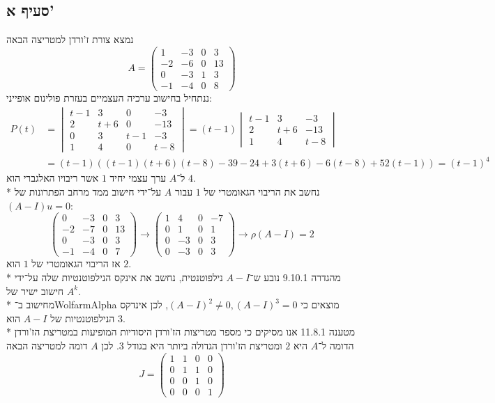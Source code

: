 \subsection{סעיף א'}
נמצא צורת ז'ורדן למטריצה הבאה
\[
	A = \begin{pmatrix}
		1 & -3 & 0 & 3 \\
		-2 & -6 & 0 & 13 \\
		0 & -3 & 1 & 3 \\
		-1 & -4 & 0 & 8
	\end{pmatrix}
\]
ננתחיל בחישוב ערכיה העצמיים בעזרת פולינום אופייני:
\begin{align*}
	P(t)
	& = \begin{vmatrix}
		t - 1 & 3 & 0 & -3 \\
		2 & t + 6 & 0 & -13 \\
		0 & 3 & t - 1 & -3 \\
		1 & 4 & 0 & t - 8
	\end{vmatrix}
	= (t - 1) \begin{vmatrix}
		t - 1 & 3 & -3 \\
		2 & t + 6 & -13 \\
		1 & 4 & t - 8
	\end{vmatrix} \\
	& = (t - 1) ((t -1) (t + 6) (t - 8) - 39 - 24 + 3 (t + 6) - 6 (t - 8) + 52 (t - 1)) = {(t - 1)}^4
\end{align*}
ל־$A$ ערך עצמי יחיד $1$ אשר ריבויו האלגברי הוא $4$. \\*
נחשב את הריבוי הגאומטרי של $1$ עבור $A$ על־ידי חישוב ממד מרחב הפתרונות של $(A - I) u = 0$:
\[
	\begin{pmatrix}
		0 & -3 & 0 & 3 \\
		-2 & -7 & 0 & 13 \\
		0 & -3 & 0 & 3 \\
		-1 & -4 & 0 & 7
	\end{pmatrix}
	\rightarrow
	\begin{pmatrix}
		1 & 4 & 0 & -7 \\
		0 & 1 & 0 & 1 \\
		0 & -3 & 0 & 3 \\
		0 & -3 & 0 & 3
	\end{pmatrix}
	\rightarrow \rho (A - I) = 2
\]
אז הריבוי הגאומטרי של $1$ הוא $2$. \\*
מהגדרה 9.10.1 נובע ש־$A - I$ נילפוטנטית, נחשב את אינקס הנילפוטנטיות שלה על־ידי חישוב ישיר של $A^k$. \\*
מחישוב ב־WolfarmAlpha מוצאים כי ${(A - I)}^2 \ne 0, {(A - I)}^3 = 0$, לכן אינדקס הנילפוטנטיות של $A - I$ הוא $3$. \\*
מטענה 11.8.1 אנו מסיקים כי מספר מטריצות הז'ורדן היסודיות המופיעות במטריצת הז'ורדן הדומה ל־$A$ היא $2$ ומטריצת הז'ורדן הגדולה ביותר היא בגודל $3$.
לכן $A$ דומה למטריצה הבאה
\[
	J = \begin{pmatrix}
		1 & 1 & 0 & 0 \\
		0 & 1 & 1 & 0 \\
		0 & 0 & 1 & 0 \\
		0 & 0 & 0 & 1
	\end{pmatrix}
\]

